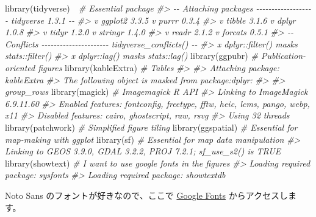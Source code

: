 \documentclass[
]{book}
\newenvironment{Shaded}{\begin{snugshade}}{\end{snugshade}}
\newcommand{\CommentTok}[1]{\textcolor[rgb]{0.56,0.35,0.01}{\textit{#1}}}
\newcommand{\FunctionTok}[1]{\textcolor[rgb]{0.00,0.00,0.00}{#1}}
\newcommand{\NormalTok}[1]{#1}
\theoremstyle{definition}
\theoremstyle{definition}
\theoremstyle{definition}
\theoremstyle{definition}
\theoremstyle{remark}
\begin{document}
\begin{Shaded}
\begin{Highlighting}[]
\FunctionTok{library}\NormalTok{(tidyverse)　}\CommentTok{\# Essential package}
\CommentTok{\#\textgreater{} {-}{-} Attaching packages {-}{-}{-}{-}{-}{-}{-}{-}{-}{-}{-}{-}{-}{-}{-}{-}{-}{-}{-} tidyverse 1.3.1 {-}{-}}
\CommentTok{\#\textgreater{} v ggplot2 3.3.5     v purrr   0.3.4}
\CommentTok{\#\textgreater{} v tibble  3.1.6     v dplyr   1.0.8}
\CommentTok{\#\textgreater{} v tidyr   1.2.0     v stringr 1.4.0}
\CommentTok{\#\textgreater{} v readr   2.1.2     v forcats 0.5.1}
\CommentTok{\#\textgreater{} {-}{-} Conflicts {-}{-}{-}{-}{-}{-}{-}{-}{-}{-}{-}{-}{-}{-}{-}{-}{-}{-}{-}{-}{-}{-} tidyverse\_conflicts() {-}{-}}
\CommentTok{\#\textgreater{} x dplyr::filter() masks stats::filter()}
\CommentTok{\#\textgreater{} x dplyr::lag()    masks stats::lag()}
\FunctionTok{library}\NormalTok{(ggpubr)     }\CommentTok{\# Publication{-}oriented figures}
\FunctionTok{library}\NormalTok{(kableExtra) }\CommentTok{\# Tables}
\CommentTok{\#\textgreater{} }
\CommentTok{\#\textgreater{} Attaching package: \textquotesingle{}kableExtra\textquotesingle{}}
\CommentTok{\#\textgreater{} The following object is masked from \textquotesingle{}package:dplyr\textquotesingle{}:}
\CommentTok{\#\textgreater{} }
\CommentTok{\#\textgreater{}     group\_rows}
\FunctionTok{library}\NormalTok{(magick)     }\CommentTok{\# Imagemagick R API}
\CommentTok{\#\textgreater{} Linking to ImageMagick 6.9.11.60}
\CommentTok{\#\textgreater{} Enabled features: fontconfig, freetype, fftw, heic, lcms, pango, webp, x11}
\CommentTok{\#\textgreater{} Disabled features: cairo, ghostscript, raw, rsvg}
\CommentTok{\#\textgreater{} Using 32 threads}
\FunctionTok{library}\NormalTok{(patchwork)  }\CommentTok{\# Simplified figure tiling}
\FunctionTok{library}\NormalTok{(ggspatial)  }\CommentTok{\# Essential for map{-}making with ggplot}
\FunctionTok{library}\NormalTok{(sf)         }\CommentTok{\# Essential for map data manipulation}
\CommentTok{\#\textgreater{} Linking to GEOS 3.9.0, GDAL 3.2.2, PROJ 7.2.1; sf\_use\_s2() is TRUE}
\FunctionTok{library}\NormalTok{(showtext)   }\CommentTok{\# I want to use google fonts in the figures}
\CommentTok{\#\textgreater{} Loading required package: sysfonts}
\CommentTok{\#\textgreater{} Loading required package: showtextdb}
\end{Highlighting}
\end{Shaded}

Noto Sans のフォントが好きなので、ここで \href{https://fonts.google.com/}{Google Fonts} からアクセスします。
\end{document}
